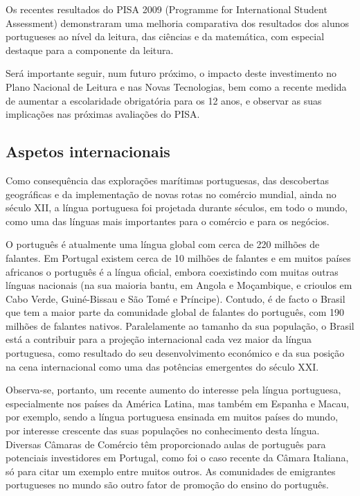 \documentclass[]{../metanetpaper}
\begin{document}
\begin{multicols}{2}
Os recentes resultados do PISA 2009 (Programme for International Student Assessment) demonstraram uma melhoria comparativa dos resultados dos alunos portugueses ao nível da leitura, das ciências e da matemática, com especial destaque para a componente da leitura. 

Será importante seguir, num futuro próximo, o impacto deste investimento no Plano Nacional de Leitura e nas Novas Tecnologias, bem como a recente medida de aumentar a escolaridade obrigatória para os 12 anos, e observar as suas implicações nas próximas avaliações do PISA.

\subsection{Aspetos internacionais}

Como consequência das explorações marítimas portuguesas, das descobertas geográficas e da implementação de novas rotas no comércio mundial, ainda no século XII, a língua portuguesa foi projetada durante séculos, em todo o mundo, como uma das línguas mais importantes para o comércio e para os negócios.

O português é atualmente uma língua global com cerca de 220 milhões de falantes. Em Portugal existem cerca de 10 milhões de falantes\cite{census} e em muitos países africanos o português é a língua oficial, em\-bo\-ra coexistindo com muitas outras línguas nacionais (na sua maioria bantu, em Angola e Moçambique, e crioulos em Cabo Verde, Guiné-Bissau e São Tomé e Príncipe). Contudo, é de facto o Brasil que tem a maior parte da comunidade global de falantes do português, com 190 milhões de falantes nativos. Paralelamente ao tamanho da sua população, o Brasil está a contribuir para a projeção internacional cada vez maior da língua portuguesa, como resultado do seu desenvolvimento económico e da sua posição na cena internacional como uma das potências emergentes do século XXI. 


Observa-se, portanto, um recente aumento do interesse pela língua portuguesa, especialmente nos países da América Latina, mas também em Espanha e Macau, por exemplo, sendo a língua portuguesa ensinada em muitos países do mundo\cite{camoes2}, por interesse crescente das suas populações no conhecimento desta língua. Diversas Câmaras de Comércio têm proporcionado aulas de português para potenciais investidores em Portugal, como foi o caso recente da Câmara Italiana, só para citar um exemplo entre muitos outros. As comunidades de emigrantes portugueses no mundo são outro fator de promoção do ensino do português.


\end{multicols}
\end{document}
